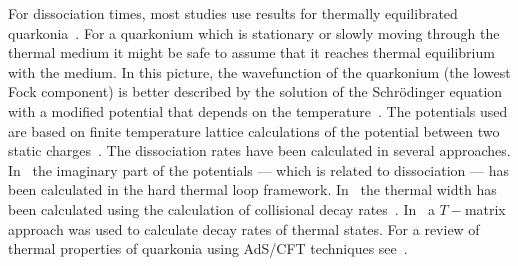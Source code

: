 \documentclass[article,showpacs,preprintnumbers,amsmath,amssymb]{revtex4}
\begin{document}
For dissociation times, most studies use results for thermally equilibrated
quarkonia~\cite{Zhao:2008vu,Strickland:LongAndShort,Rapp:2009my}.  For a
quarkonium which is stationary or slowly moving through the thermal medium it might be
safe to assume that it reaches thermal equilibrium with the medium. In this
picture, the wavefunction of the quarkonium (the lowest Fock component) is
better described by the solution of the Schr\"{o}dinger equation with a
modified potential that depends on the
temperature~\cite{Mocsy:2007jz,Rapp:2009my,Strickland:LongAndShort,Margotta:2011ta}.
The potentials used are based on finite temperature lattice calculations of the
potential between two static charges~\cite{Kaczmarek:2005ui}. The dissociation
rates have been calculated in several approaches.
In~\cite{Laine:2006ns,Brambilla:2008cx} the imaginary part of the potentials
--- which is related to dissociation --- has been calculated in the hard
thermal loop framework. In~\cite{Park:2007zza}  the thermal width has been
calculated using the calculation of collisional decay rates~\cite{Peskin:1979}.
In~\cite{Rapp:2009my} a  $T-$matrix approach was used to calculate decay rates
of thermal states. For a review of thermal properties of quarkonia using 
AdS/CFT techniques see~\cite{CasalderreySolana:2011us}.
\end{document}
